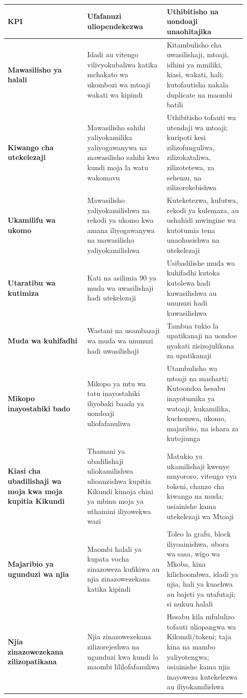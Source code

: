 \documentclass[11pt]{article}
\begin{document}
\begin{longtable}{P{0.31\linewidth} P{0.31\linewidth} P{0.31\linewidth}}
\toprule
KPI & Ufafanuzi uliopendekezwa & Uthibitisho na uondoaji unaohitajika \\
\midrule
\endhead
\textbf{Mawasilisho ya halali} & Idadi au vitengo vilivyokubaliwa katika mchakato wa ukombozi wa mtoaji wakati wa kipindi & Kitambulisho cha uwasilishaji, mtoaji, idhini ya mmiliki, kiasi, wakati, hali; kutofautisha nakala duplicate na maombi batili \\
\textbf{Kiwango cha utekelezaji} & Mawasilisho sahihi yaliyokamilika yaliyogawanywa na mawasilisho sahihi kwa kundi moja la watu wakomavu & Uthibitisho tofauti wa utendaji wa mtoaji; kuripoti kesi zilizofunguliwa, zilizokataliwa, zilizotetewa, za sehemu, na zilizorekebishwa \\
\textbf{Ukamilifu wa ukomo} & Mawasilisho yaliyokamilishwa na rekodi ya ukomo kwa amana iliyogawanywa na mawasilisho yaliyokamilishwa & Kuteketezwa, kufutwa, rekodi ya kulemaza, au ushahidi mwingine wa kutotumia tena unaohusishwa na utekelezaji \\
\textbf{Utaratibu wa kutimiza} & Kati na asilimia 90 ya muda wa uwasilishaji hadi utekelezaji & Usibadilishe muda wa kuhifadhi kutoka kutolewa hadi kuwasilishwa au ununuzi hadi kuwasilishwa \\
\textbf{Muda wa kuhifadhi} & Wastani na usambazaji wa muda wa ununuzi hadi uwasilishaji & Tambua tukio la upatikanaji na uondoe nyakati zisizojulikana za upatikanaji \\
\textbf{Mikopo inayostahiki bado} & Mikopo ya mtu wa tatu inayostahiki iliyobaki baada ya uondoaji uliofafanuliwa & Utambulisho wa mtoaji na masharti; Kutoondoa hesabu inayotumika ya watoaji, kukamilika, kuchomwa, ukomo, majaribio, na ishara za kutojiunga \\
\textbf{Kiasi cha ubadilishaji wa moja kwa moja kupitia Kikundi} & Thamani ya ubadilishaji uliokamilishwa ulioanzishwa kupitia Kikundi kimoja chini ya mbinu moja ya uthamini iliyowekwa wazi & Matukio ya ukamilishaji kwenye mnyororo, vitengo vya tokeni, chanzo cha kiwango na muda; usiainishe kama utekelezaji wa Mtoaji \\
\textbf{Majaribio ya ugunduzi wa njia} & Maombi halali ya kupata vocha zinazoweza kufikiwa au njia zinazowezekana katika kipindi & Toleo la grafu, block iliyoainishwa, ubora wa sasa, wigo wa Mkoba, kina kilichoombwa, idadi ya njia, hali ya kuachwa au bajeti ya utafutaji; si nukuu halali \\
\textbf{Njia zinazowezekana zilizopatikana} & Njia zinazowezekana zilizorejeshwa na ugunduzi kwa kundi la maombi lililofafanuliwa & Hesabu kila mfululizo tofauti uliopangwa wa Kikundi/tokeni; taja kina na mambo yaliyotengwa; usiainishe kama njia inayoweza kutekelezwa au iliyokamilishwa \\

\end{longtable}
\end{document}
